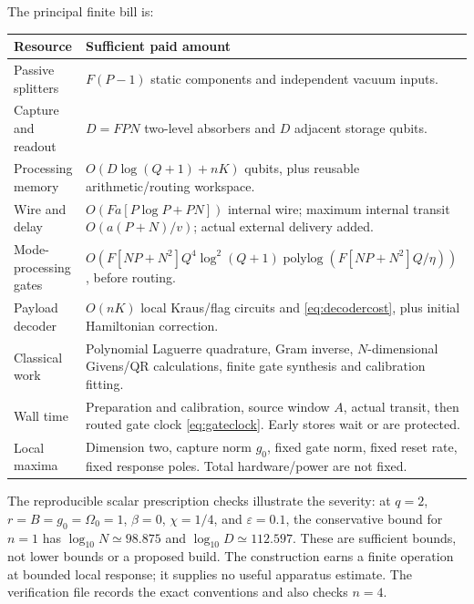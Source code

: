 \documentclass[11pt,a4paper]{article}
\begin{document}
The principal finite bill is:
\begin{center}\small
\begin{tabular}{p{}p{}}
\toprule Resource & Sufficient paid amount\\\midrule
Passive splitters & $F(P-1)$ static components and independent vacuum inputs.\\
Capture and readout & $D=FPN$ two-level absorbers and $D$ adjacent storage qubits.\\
Processing memory & $O(D\log(Q+1)+nK)$ qubits, plus reusable arithmetic/routing workspace.\\
Wire and delay & $O(Fa[P\log P+PN])$ internal wire; maximum internal transit $O(a(P+N)/v)$; actual external delivery added.\\
Mode-processing gates & $O(F[NP+N^2]Q^4\log^2(Q+1)\operatorname{polylog}(F[NP+N^2]Q/\eta))$, before routing.\\
Payload decoder & $O(nK)$ local Kraus/flag circuits and \eqref{eq:decodercost}, plus initial Hamiltonian correction.\\
Classical work & Polynomial Laguerre quadrature, Gram inverse, $N$-dimensional Givens/QR calculations, finite gate synthesis and calibration fitting.\\
Wall time & Preparation and calibration, source window $A$, actual transit, then routed gate clock \eqref{eq:gateclock}. Early stores wait or are protected.\\
Local maxima & Dimension two, capture norm $g_0$, fixed gate norm, fixed reset rate, fixed response poles. Total hardware/power are not fixed.\\\bottomrule
\end{tabular}
\end{center}

The reproducible scalar prescription checks illustrate the severity: at $q=2$, $r=B=g_0=\Omega_0=1$, $\beta=0$, $\chi=1/4$, and $\varepsilon=0.1$, the conservative bound for $n=1$ has $\log_{10}N\simeq98.875$ and $\log_{10}D\simeq112.597$. These are sufficient bounds, not lower bounds or a proposed build. The construction earns a finite operation at bounded local response; it supplies no useful apparatus estimate. The verification file records the exact conventions and also checks $n=4$.
\end{document}
